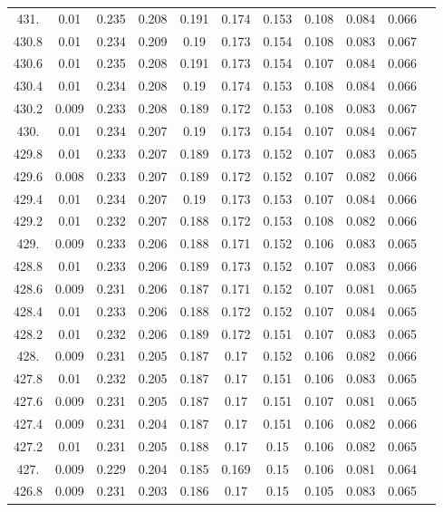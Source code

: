 \documentclass[12pt]{ctexart}
\numberwithin{equation}{section}
\begin{document}
\begin{longtable}{ccccccccccc}
431.	&	0.01	&	0.235	&	0.208	&	0.191	&	0.174	&	0.153	&	0.108	&	0.084	&	0.066	\\
430.8	&	0.01	&	0.234	&	0.209	&	0.19	&	0.173	&	0.154	&	0.108	&	0.083	&	0.067	\\
430.6	&	0.01	&	0.235	&	0.208	&	0.191	&	0.173	&	0.154	&	0.107	&	0.084	&	0.066	\\
430.4	&	0.01	&	0.234	&	0.208	&	0.19	&	0.174	&	0.153	&	0.108	&	0.084	&	0.066	\\
430.2	&	0.009	&	0.233	&	0.208	&	0.189	&	0.172	&	0.153	&	0.108	&	0.083	&	0.067	\\
430.	&	0.01	&	0.234	&	0.207	&	0.19	&	0.173	&	0.154	&	0.107	&	0.084	&	0.067	\\
429.8	&	0.01	&	0.233	&	0.207	&	0.189	&	0.173	&	0.152	&	0.107	&	0.083	&	0.065	\\
429.6	&	0.008	&	0.233	&	0.207	&	0.189	&	0.172	&	0.152	&	0.107	&	0.082	&	0.066	\\
429.4	&	0.01	&	0.234	&	0.207	&	0.19	&	0.173	&	0.153	&	0.107	&	0.084	&	0.066	\\
429.2	&	0.01	&	0.232	&	0.207	&	0.188	&	0.172	&	0.153	&	0.108	&	0.082	&	0.066	\\
429.	&	0.009	&	0.233	&	0.206	&	0.188	&	0.171	&	0.152	&	0.106	&	0.083	&	0.065	\\
428.8	&	0.01	&	0.233	&	0.206	&	0.189	&	0.173	&	0.152	&	0.107	&	0.083	&	0.066	\\
428.6	&	0.009	&	0.231	&	0.206	&	0.187	&	0.171	&	0.152	&	0.107	&	0.081	&	0.065	\\
428.4	&	0.01	&	0.233	&	0.206	&	0.188	&	0.172	&	0.152	&	0.107	&	0.084	&	0.065	\\
428.2	&	0.01	&	0.232	&	0.206	&	0.189	&	0.172	&	0.151	&	0.107	&	0.083	&	0.065	\\
428.	&	0.009	&	0.231	&	0.205	&	0.187	&	0.17	&	0.152	&	0.106	&	0.082	&	0.066	\\
427.8	&	0.01	&	0.232	&	0.205	&	0.187	&	0.17	&	0.151	&	0.106	&	0.083	&	0.065	\\
427.6	&	0.009	&	0.231	&	0.205	&	0.187	&	0.17	&	0.151	&	0.107	&	0.081	&	0.065	\\
427.4	&	0.009	&	0.231	&	0.204	&	0.187	&	0.17	&	0.151	&	0.106	&	0.082	&	0.066	\\
427.2	&	0.01	&	0.231	&	0.205	&	0.188	&	0.17	&	0.15	&	0.106	&	0.082	&	0.065	\\
427.	&	0.009	&	0.229	&	0.204	&	0.185	&	0.169	&	0.15	&	0.106	&	0.081	&	0.064	\\
426.8	&	0.009	&	0.231	&	0.203	&	0.186	&	0.17	&	0.15	&	0.105	&	0.083	&	0.065	\\

\end{longtable}
\end{document}
